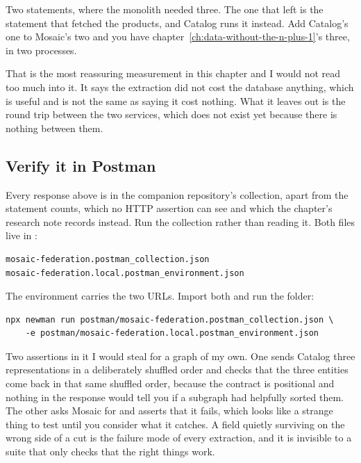 Two statements, where the monolith needed three. The one that left is the
statement that fetched the products, and Catalog runs it instead. Add Catalog's
one to Mosaic's two and you have chapter~\ref{ch:data-without-the-n-plus-1}'s
three, in two processes.

That is the most reassuring measurement in this chapter and I would not read too
much into it. It says the extraction did not cost the database anything, which
is useful and is not the same as saying it cost nothing. What it leaves out is
the round trip between the two services, which does not exist yet because there
is nothing between them.

\subsection*{Verify it in Postman}

%
Every response above is in the companion repository's collection, apart from the
statement counts, which no HTTP assertion can see and which the chapter's
research note records instead. Run the collection rather than reading it. Both
files live in :

\begin{verbatim}
mosaic-federation.postman_collection.json
mosaic-federation.local.postman_environment.json
\end{verbatim}

The environment carries the two URLs. Import both and run the folder:

\begin{verbatim}
npx newman run postman/mosaic-federation.postman_collection.json \
    -e postman/mosaic-federation.local.postman_environment.json
\end{verbatim}

%
Two assertions in it I would steal for a graph of my own. One sends Catalog
three representations in a deliberately shuffled order and checks that the three
entities come back in that same shuffled order, because the contract is
positional and nothing in the response would tell you if a subgraph had
helpfully sorted them. The other asks Mosaic for \code{products} and asserts
that it fails, which looks like a strange thing to test until you consider what
it catches. A field quietly surviving on the wrong side of a cut is the failure
mode of every extraction, and it is invisible to a suite that only checks that
the right things work.

%

